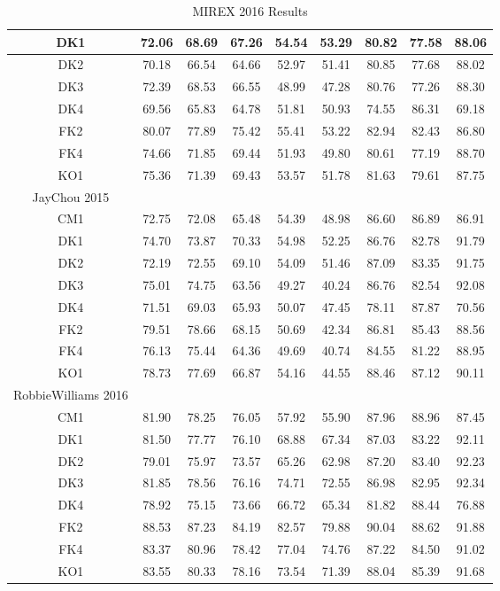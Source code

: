 \begin{table*}[htbp]
\begin{tabular}{|c|c|c|c|c|c|c|c|c|}
DK1 & 72.06 & 68.69 & 67.26 & 54.54 & 53.29 & 80.82 & 77.58 & 88.06\\ \hline
DK2 & 70.18 & 66.54 & 64.66 & 52.97 & 51.41 & 80.85 & 77.68 & 88.02\\ \hline
DK3 & 72.39 & 68.53 & 66.55 & 48.99 & 47.28 & 80.76 & 77.26 & 88.30\\ \hline
DK4 & 69.56 & 65.83 & 64.78 & 51.81 & 50.93 & 74.55 & 86.31 & 69.18\\ \hline
FK2 & 80.07 & 77.89 & 75.42 & 55.41 & 53.22 & 82.94 & 82.43 & 86.80\\ \hline
FK4 & 74.66 & 71.85 & 69.44 & 51.93 & 49.80 & 80.61 & 77.19 & 88.70\\ \hline
KO1 & 75.36 & 71.39 & 69.43 & 53.57 & 51.78 & 81.63 & 79.61 & 87.75\\ \hline
JayChou 2015 \\ \hline
CM1 & 72.75 & 72.08 & 65.48 & 54.39 & 48.98 & 86.60 & 86.89 & 86.91\\ \hline
DK1 & 74.70 & 73.87 & 70.33 & 54.98 & 52.25 & 86.76 & 82.78 & 91.79\\ \hline
DK2 & 72.19 & 72.55 & 69.10 & 54.09 & 51.46 & 87.09 & 83.35 & 91.75\\ \hline
DK3 & 75.01 & 74.75 & 63.56 & 49.27 & 40.24 & 86.76 & 82.54 & 92.08\\ \hline
DK4 & 71.51 & 69.03 & 65.93 & 50.07 & 47.45 & 78.11 & 87.87 & 70.56\\ \hline
FK2 & 79.51 & 78.66 & 68.15 & 50.69 & 42.34 & 86.81 & 85.43 & 88.56\\ \hline
FK4 & 76.13 & 75.44 & 64.36 & 49.69 & 40.74 & 84.55 & 81.22 & 88.95\\ \hline
KO1 & 78.73 & 77.69 & 66.87 & 54.16 & 44.55 & 88.46 & 87.12 & 90.11\\ \hline
RobbieWilliams 2016 \\ \hline
CM1 & 81.90 & 78.25 & 76.05 & 57.92 & 55.90 & 87.96 & 88.96 & 87.45\\ \hline
DK1 & 81.50 & 77.77 & 76.10 & 68.88 & 67.34 & 87.03 & 83.22 & 92.11\\ \hline
DK2 & 79.01 & 75.97 & 73.57 & 65.26 & 62.98 & 87.20 & 83.40 & 92.23\\ \hline
DK3 & 81.85 & 78.56 & 76.16 & 74.71 & 72.55 & 86.98 & 82.95 & 92.34\\ \hline
DK4 & 78.92 & 75.15 & 73.66 & 66.72 & 65.34 & 81.82 & 88.44 & 76.88\\ \hline
FK2 & 88.53 & 87.23 & 84.19 & 82.57 & 79.88 & 90.04 & 88.62 & 91.88\\ \hline
FK4 & 83.37 & 80.96 & 78.42 & 77.04 & 74.76 & 87.22 & 84.50 & 91.02\\ \hline
KO1 & 83.55 & 80.33 & 78.16 & 73.54 & 71.39 & 88.04 & 85.39 & 91.68\\ \hline
\end{tabular}
\caption{MIREX 2016 Results}
\label{tab:3-mirex2016}
\end{table*}


